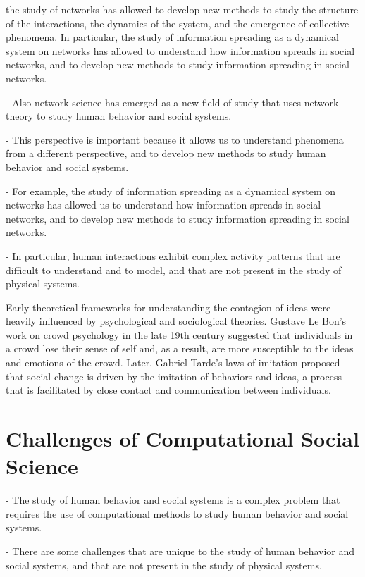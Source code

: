 the study of networks has allowed to develop new methods to study the structure of the interactions, the dynamics of the system, and the emergence of collective phenomena. In particular, the study of information spreading as a dynamical system on networks has allowed to understand how information spreads in social networks, and to develop new methods to study information spreading in social networks.


- Also network science has emerged as a new field of study that uses network theory to study human behavior and social systems.

- This perspective is important because it allows us to understand phenomena from a different perspective, and to develop new methods to study human behavior and social systems. 

- For example, the study of information spreading as a dynamical system on networks has allowed us to understand how information spreads in social networks, and to develop new methods to study information spreading in social networks.

- In particular, human interactions exhibit complex activity patterns that are difficult to understand and to model, and that are not present in the study of physical systems.

Early theoretical frameworks for understanding the contagion of ideas were heavily influenced by psychological and sociological theories. Gustave Le Bon's work on crowd psychology in the late 19th century suggested that individuals in a crowd lose their sense of self and, as a result, are more susceptible to the ideas and emotions of the crowd. Later, Gabriel Tarde's laws of imitation proposed that social change is driven by the imitation of behaviors and ideas, a process that is facilitated by close contact and communication between individuals.


\section{\label{sec:Challenges of Computational Social Science} Challenges of Computational Social Science}

- The study of human behavior and social systems is a complex problem that requires the use of computational methods to study human behavior and social systems.

- There are some challenges that are unique to the study of human behavior and social systems, and that are not present in the study of physical systems.

